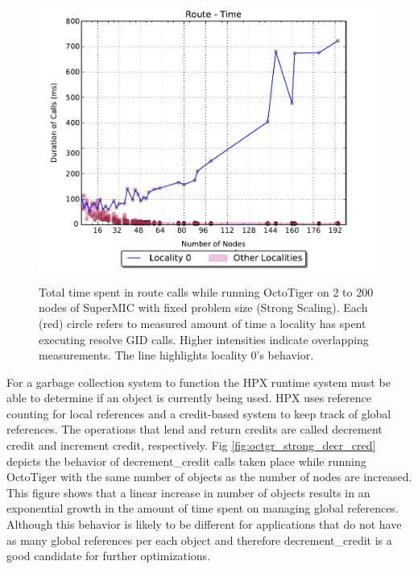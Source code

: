 \begin{figure}[h]
    \centering
    \vspace{2.5cm}
    \caption{Total time spent in route calls while running OctoTiger on 2 to 200 nodes of SuperMIC with fixed problem size (Strong Scaling). Each (red) circle refers to measured amount of time a locality has spent executing resolve GID calls. Higher intensities indicate overlapping measurements. The line highlights locality 0's behavior.}
    \includegraphics[width=.67\textwidth,height=\textheight,keepaspectratio]{graphs/octotiger_route_time}
    \label{fig:octgr_strong_route_time}
\end{figure}
For a garbage collection system to function the HPX runtime system must be able
to determine if an object is currently being used. HPX uses reference counting
for local references and a credit-based system to keep track of global
references. The operations that lend and return credits are called decrement
credit and increment credit, respectively.
Fig \ref{fig:octgr_strong_decr_cred} depicts the behavior of decrement\_credit
calls taken place while running OctoTiger with the same number of objects as
the number of nodes are increased. This figure shows that a
linear increase in number of objects results in an exponential growth
in the amount of time spent on managing global references. Although this
behavior is likely to be different for applications that do not have as many
global references per each object and therefore decrement\_credit is a good
candidate for further optimizations.

